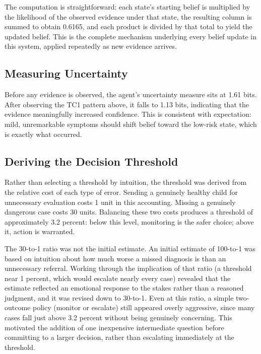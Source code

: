 \documentclass{article}
\begin{document}
The computation is straightforward: each state's starting belief is
multiplied by the likelihood of the observed evidence under that state,
the resulting column is summed to obtain 0.6165, and each product is
divided by that total to yield the updated belief. This is the complete
mechanism underlying every belief update in this system, applied
repeatedly as new evidence arrives.

\hypertarget{measuring-uncertainty}{%
\subsection{Measuring Uncertainty}\label{measuring-uncertainty}}

Before any evidence is observed, the agent's uncertainty measure sits at
1.61 bits. After observing the TC1 pattern above, it falls to 1.13 bits,
indicating that the evidence meaningfully increased confidence. This is
consistent with expectation: mild, unremarkable symptoms should shift
belief toward the low-risk state, which is exactly what occurred.

\hypertarget{deriving-the-decision-threshold}{%
\subsection{Deriving the Decision
Threshold}\label{deriving-the-decision-threshold}}

Rather than selecting a threshold by intuition, the threshold was
derived from the relative cost of each type of error. Sending a
genuinely healthy child for unnecessary evaluation costs 1 unit in this
accounting. Missing a genuinely dangerous case costs 30 units. Balancing
these two costs produces a threshold of approximately 3.2 percent: below
this level, monitoring is the safer choice; above it, action is
warranted.

The 30-to-1 ratio was not the initial estimate. An initial estimate of
100-to-1 was based on intuition about how much worse a missed diagnosis
is than an unnecessary referral. Working through the implication of that
ratio (a threshold near 1 percent, which would escalate nearly every
case) revealed that the estimate reflected an emotional response to the
stakes rather than a reasoned judgment, and it was revised down to
30-to-1. Even at this ratio, a simple two-outcome policy (monitor or
escalate) still appeared overly aggressive, since many cases fall just
above 3.2 percent without being genuinely concerning. This motivated the
addition of one inexpensive intermediate question before committing to a
larger decision, rather than escalating immediately at the threshold.
\end{document}

